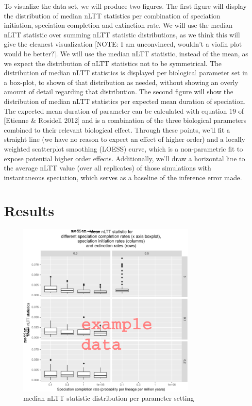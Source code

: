 \documentclass{article}
\begin{document}
To visualize the data set, we will produce two figures.
The first figure will display the distribution 
of median nLTT statistics per combination of speciation initiation, speciation
completion and extinction rate. We will use the median nLTT statistic over 
summing nLTT statistic distributions, as we think this will give the cleanest
visualization [NOTE: I am unconvinced, wouldn't a violin plot would
be better?]. We will use the median nLTT statistic, instead of the mean, as
we expect the distribution of nLTT statistics not to be symmetrical. The distribution
of median nLTT statistics is displayed per biological parameter set in a box-plot,
to shown of that distribution as needed, without showing an overly amount of detail
regarding that distribution. 
The second figure will show the distribution of median nLTT statistics per expected
mean duration of speciation. The expected mean duration of parameter can be calculated
with equation 19 of [Etienne \& Rosidell 2012] and is a combination of the three
biological parameters combined to their relevant biological effect. Through these
points, we'll fit a straight line (we have no reason to expect an effect of
higher order) and a locally weighted scatterplot smoothing (LOESS) 
curve, which is a non-parametric fit to expose potential higher order effects.
Additionally, we'll draw a horizontal line to the average nLTT 
value (over all replicates) of those simulations with instantaneous speciation, 
which serves as a baseline of
the inference error made.

\section{Results}

\begin{figure}[!htbp]
  \includegraphics[width=0.8\textwidth]{nltt_stats_per_setup.png}
  \caption{
    median nLTT statistic distribution per parameter setting
  }
\end{figure}
\end{document}

